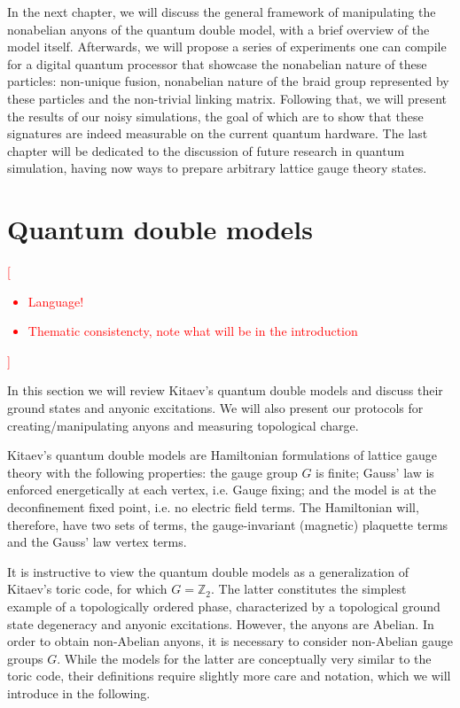 \documentclass[two column]{article}
\newcommand{\caro}[1]{\textcolor{red}{[#1]}}
\begin{document}
In the next chapter, we will discuss the general framework of manipulating the nonabelian anyons of the quantum double model, with a brief overview of the model itself. Afterwards, we will propose a series of experiments one can compile for a digital quantum processor that showcase the nonabelian nature of these particles: non-unique fusion, nonabelian nature of the braid group represented by these particles and the non-trivial linking matrix. Following that, we will present the results of our noisy simulations, the goal of which are to show that these signatures are indeed measurable on the current quantum hardware. The last chapter will be dedicated to the discussion of future research in quantum simulation, having now ways to prepare arbitrary lattice gauge theory states.

\section{Quantum double models}
\caro{\begin{itemize}
\item Language!
\item Thematic consistencty, note what will be in the introduction
\end{itemize}}

In this section we will review Kitaev's quantum double models\cite{Kitaev_2003} and discuss their ground states and anyonic excitations. We will also present our protocols for creating/manipulating anyons and measuring topological charge. 

Kitaev's quantum double models are Hamiltonian formulations of lattice gauge theory with the following properties:
the gauge group $G$ is finite;
Gauss' law is enforced energetically at each vertex, i.e. Gauge fixing;
and the model is at the deconfinement fixed point, i.e. no electric field terms.
The Hamiltonian will, therefore, have two sets of terms, the gauge-invariant (magnetic) plaquette terms and the Gauss' law vertex terms\cite{cui2018topological, Kitaev_2003}. 


It is instructive to view the quantum double models as a generalization of Kitaev's toric code, for which $G=\mathbb Z_2$. The latter constitutes the simplest example of a topologically ordered phase, characterized by a topological ground state degeneracy and anyonic excitations. However, the anyons are Abelian. In order to obtain non-Abelian anyons, it is necessary to consider non-Abelian gauge groups $G$. While the models for the latter are conceptually very similar to the toric code, their definitions require slightly more care and notation, which we will introduce in the following.
\end{document}
